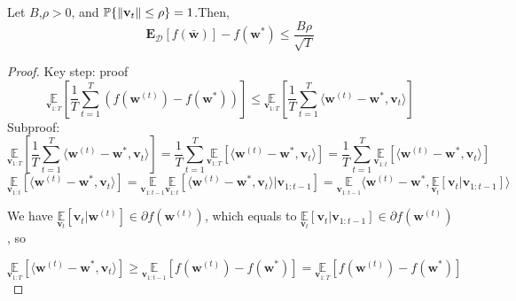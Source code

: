 \begin{thm}
	Let $B$,$\rho > 0$, and $\mathbb{P}\{\Arrowvert\mathbf{v}_t\Arrowvert\le\rho\}=1$.Then,
	\begin{equation}
		\mathbf{E}_\mathcal{D} [f(\bar{\mathbf{w}})] - f(\mathbf{w}^*)
		\le \frac{B\rho}{\sqrt{T}}
	\end{equation}
	\begin{proof}
		Key step: proof 
		\begin{equation}
			 \underset{\mathbf{v}_{1:T}}{\mathbb{E}}
			\left[ \frac{1}{T} \sum\limits^T_{t=1}(f(\mathbf{w}^{(t)})- f(\mathbf{w}^*)) \right] 
			\le \underset{\mathbf{v}_{1:T}}{\mathbb{E}}
			\left[ \frac{1}{T} \sum^T_{t=1} \langle \mathbf{w}^{(t)}-\mathbf{w}^*, \mathbf{v}_t \rangle \right]
		\end{equation}
		Subproof:
		\[ 
			\underset{\mathbf{v}_{1:T}}{\mathbb{E}}
			\left[ \frac{1}{T} \sum^T_{t=1} \langle \mathbf{w}^{(t)}-\mathbf{w}^*, \mathbf{v}_t \rangle \right]
			=  \frac{1}{T} \sum^T_{t=1} \underset{\mathbf{v}_{1:T}}{\mathbb{E}}
			\left[ \langle \mathbf{w}^{(t)}-\mathbf{w}^*, \mathbf{v}_t \rangle \right]
			=  \frac{1}{T} \sum^T_{t=1} \underset{\mathbf{v}_{1:t}}{\mathbb{E}}
			\left[ \langle \mathbf{w}^{(t)}-\mathbf{w}^*, \mathbf{v}_t \rangle \right]
		\]
		\[ 
			\underset{\mathbf{v}_{1:t}}{\mathbb{E}}
			\left[ \langle \mathbf{w}^{(t)}-\mathbf{w}^*, \mathbf{v}_t \rangle \right]
			= 
			\underset{\mathbf{v}_{1:t-1}}{\mathbb{E}}
			\underset{\mathbf{v}_{1:t}}{\mathbb{E}}
			\left[ \langle \mathbf{w}^{(t)}-\mathbf{w}^*, \mathbf{v}_t \rangle | \mathbf{v}_{1:t-1}\right]
			=
			\underset{\mathbf{v}_{1:t-1}}{\mathbb{E}}
			\langle \mathbf{w}^{(t)}-\mathbf{w}^*,
			\underset{\mathbf{v}_{t}}{\mathbb{E}}
			\left[\mathbf{v}_t | \mathbf{v}_{1:t-1}\right] \rangle
		\]

		We have 
		$ \underset{\mathbf{v}_t}{\mathbb{E}}
		[\mathbf{v}_t | \mathbf{w}^{(t)}] \in \partial f(\mathbf{w}^{(t)})$,
		which equals to
		$ \underset{\mathbf{v}_t}{\mathbb{E}}
		[\mathbf{v}_t | \mathbf{v}_{1:t-1}] \in \partial f(\mathbf{w}^{(t)})$,
		so

		\[ 
			\underset{\mathbf{v}_{1:T}}{\mathbb{E}}
			\left[ \langle \mathbf{w}^{(t)}-\mathbf{w}^*, \mathbf{v}_t \rangle \right]
			\ge
			\underset{\mathbf{v}_{1:t-1}}{\mathbb{E}}
			\left[ f(\mathbf{w}^{(t)}) - f(\mathbf{w}^*) \right]
			=
			\underset{\mathbf{v}_{1:T}}{\mathbb{E}}
			\left[ f(\mathbf{w}^{(t)}) - f(\mathbf{w}^*) \right]
		\]
	\end{proof}
\end{thm}

